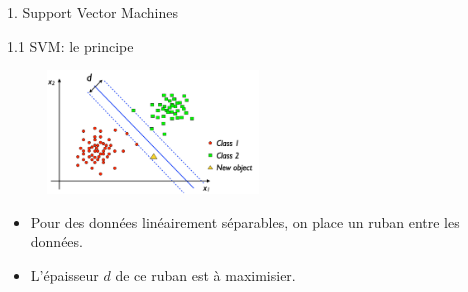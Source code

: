 \begin{frame}
  \begin{center}
    \large{1. Support Vector Machines}
  \end{center}
\end{frame}


\begin{frame}{1.1 SVM: le principe}
  \begin{figure}[htb]
    \includegraphics[width=0.5\textwidth]{figures/SVM_general.pdf}
  \end{figure}
  \begin{itemize}
    \item Pour des données linéairement séparables, on place un ruban entre les données. 
    \item L'épaisseur $d$ de ce ruban est à maximisier. 
  \end{itemize}
\end{frame}

